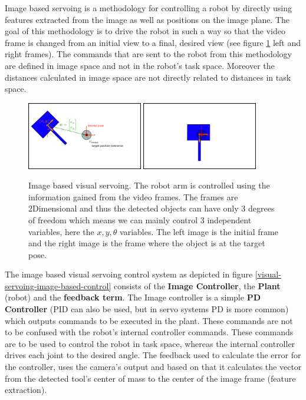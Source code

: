Image based servoing is a methodology for controlling a robot by directly using features extracted from the image as well as positions on the image plane. The goal of this methodology is 
to drive the robot in such a way so that the video frame is changed from an initial view to a final, desired view (see figure \ref{image-based-servoing-start-end} left and right frames). The commands 
that are sent to the robot from this methodology are defined in image space and not in the robot's task space. Moreover the distances calculated in image space are not directly related to distances 
in task space.

\begin{center}
\begin{figure}[!htb]
\centering
\includegraphics[width=0.45\textwidth]{images/visual_servo_start.png}
\includegraphics[width=0.45\textwidth]{images/visual_servo_end.png}\\
\caption{Image based visual servoing. The robot arm is controlled using the information gained from the video frames. The frames are 2Dimensional and thus 
the detected objects can have only 3 degrees of freedom which means we can mainly control 3 independent variables, here the $x,y,θ$ variables. The left image 
is the initial frame and the right image is the frame where the object is at the target pose.}
\label{image-based-servoing-start-end}
\end{figure}
\end{center}

The image based visual servoing control system as depicted in figure \ref{visual-servoing-image-based-control} consists of the \textbf{Image Controller}, the \textbf{Plant} (robot) and the \textbf{feedback term}. The Image controller is a simple 
\textbf{PD Controller} (PID can also be used, but in servo systems PD is more common) which outputs commands to be executed in the plant. These commands are not to be confused with the robot's internal controller commands. 
These commands are to be used to control the robot in task space, whereas the internal controller drives each joint to the desired angle. The feedback used to calculate the error for the controller, uses the camera's 
output and based on that it calculates the vector from the detected tool's center of mass to the center of the image frame (feature extraction).

